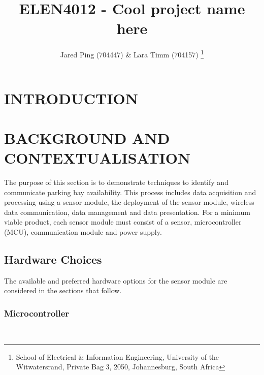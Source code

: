 \documentclass[10pt,twocolumn]{witseiepaper}
\begin{document}
	
	
\title{ELEN4012 - Cool project name here}
	
\author{Jared Ping (704447) \& Lara Timm (704157)
	\thanks{School of Electrical \& Information Engineering, University of the
			Witwatersrand, Private Bag 3, 2050, Johannesburg, South Africa}
}
	
\abstract{}
	
\keywords{}
	
\maketitle
\section{INTRODUCTION}



\section{BACKGROUND AND CONTEXTUALISATION}
	The purpose of this section is to demonstrate techniques to identify and communicate parking bay availability. This process includes data acquisition and processing using a sensor module, the deployment of the sensor module, wireless data communication, data management and data presentation. For a minimum viable product, each sensor module must consist of a sensor, microcontroller (MCU), communication module and power supply.

	\subsection{Hardware Choices} 
	
		The available and preferred hardware options for the sensor module are considered in the sections that follow.
	
		\subsubsection{Microcontroller} $   $
		
\end{document}
